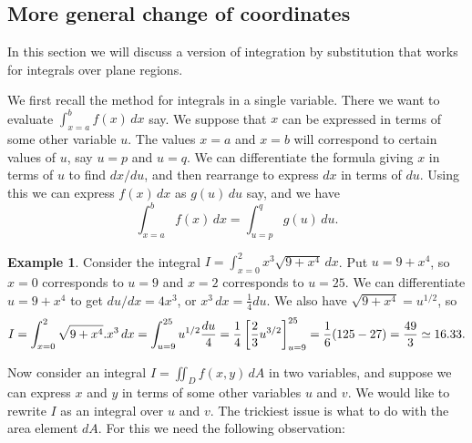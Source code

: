 \documentclass[reqno]{amsart}
\theoremstyle{definition}
\newtheorem{example}[theorem]{Example}
\begin{document}
\subsection{More general change of coordinates}
\label{subsec-jacobian}

In this section we will discuss a version of integration by
substitution that works for integrals over plane regions.

We first recall the method for integrals in a single variable.  There
we want to evaluate $\int_{x=a}^bf(x)\,dx$ say.  We suppose that $x$
can be expressed in terms of some other variable $u$.  The values
$x=a$ and $x=b$ will correspond to certain values of $u$, say $u=p$
and $u=q$.  We can differentiate the formula giving $x$ in terms of
$u$ to find $dx/du$, and then rearrange to express $dx$ in terms of
$du$.  Using this we can express $f(x)\,dx$ as $g(u)\,du$ say, and we
have 
\[ \int_{x=a}^b f(x)\, dx = \int_{u=p}^q g(u)\, du. \]

\begin{example}
 Consider the integral $I=\int_{x=0}^2x^3\sqrt{9+x^4}\,dx$.  Put
 $u=9+x^4$, so $x=0$ corresponds to $u=9$ and $x=2$ corresponds to
 $u=25$.  We can differentiate $u=9+x^4$ to get $du/dx=4x^3$, or
 $x^3\,dx=\frac{1}{4}du$.  We also have $\sqrt{9+x^4}=u^{1/2}$, so 
 \[ I = \int_{x=0}^2 \sqrt{9+x^4}.x^3\,dx 
      = \int_{u=9}^{25} u^{1/2} \frac{du}{4} 
      = \frac{1}{4}\CH{\frac{2}{3}u^{3/2}}_{u=9}^{25}
      = \frac{1}{6}(125-27) = \frac{49}{3} \simeq 16.33.
 \]
\end{example}

Now consider an integral $I=\iint_D f(x,y)\,dA$ in two variables, and
suppose we can express $x$ and $y$ in terms of some other variables
$u$ and $v$.  We would like to rewrite $I$ as an integral over $u$ and
$v$.  The trickiest issue is what to do with the area element $dA$.
For this we need the following observation:
\end{document}

